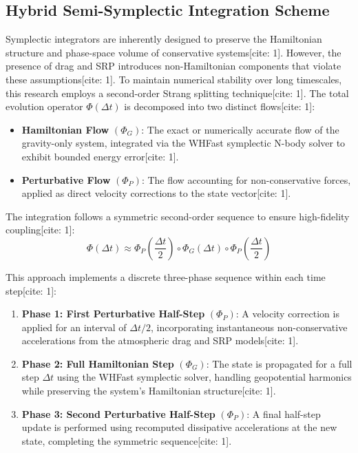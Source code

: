 \documentclass[conf]{AAS} %
\begin{document}
\subsection{Hybrid Semi-Symplectic Integration Scheme}
Symplectic integrators are inherently designed to preserve the Hamiltonian structure and phase-space volume of conservative systems[cite: 1]. However, the presence of drag and SRP introduces non-Hamiltonian components that violate these assumptions[cite: 1]. To maintain numerical stability over long timescales, this research employs a second-order Strang splitting technique[cite: 1]. The total evolution operator $\Phi(\Delta t)$ is decomposed into two distinct flows[cite: 1]:
\begin{itemize}
    \item \textbf{Hamiltonian Flow} $(\Phi_G)$: The exact or numerically accurate flow of the gravity-only system, integrated via the WHFast symplectic N-body solver to exhibit bounded energy error[cite: 1].
    \item \textbf{Perturbative Flow} $(\Phi_P)$: The flow accounting for non-conservative forces, applied as direct velocity corrections to the state vector[cite: 1].
\end{itemize}

The integration follows a symmetric second-order sequence to ensure high-fidelity coupling[cite: 1]:
\begin{equation}
    \Phi(\Delta t) \approx \Phi_P\left(\frac{\Delta t}{2}\right) \circ \Phi_G(\Delta t) \circ \Phi_P\left(\frac{\Delta t}{2}\right)
    \label{eq:strang_splitting}
\end{equation}

This approach implements a discrete three-phase sequence within each time step[cite: 1]:
\begin{enumerate}
    \item \textbf{Phase 1: First Perturbative Half-Step} $(\Phi_P)$: A velocity correction is applied for an interval of $\Delta t/2$, incorporating instantaneous non-conservative accelerations from the atmospheric drag and SRP models[cite: 1].
    \item \textbf{Phase 2: Full Hamiltonian Step} $(\Phi_G)$: The state is propagated for a full step $\Delta t$ using the WHFast symplectic solver, handling geopotential harmonics while preserving the system's Hamiltonian structure[cite: 1].
    \item \textbf{Phase 3: Second Perturbative Half-Step} $(\Phi_P)$: A final half-step update is performed using recomputed dissipative accelerations at the new state, completing the symmetric sequence[cite: 1].
\end{enumerate}
\end{document}

